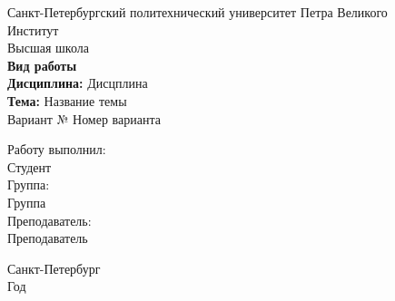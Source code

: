 \documentclass[12pt,a4paper]{scrartcl}
\begin{document}
\begin{titlepage}
\begin{center}

\large
Санкт-Петербургский политехнический университет Петра Великого %
\\
Институт %
\\
Высшая школа %
\\[5.5cm]


\large \textbf{
Вид работы %
}\\
\large \textbf{Дисциплина:}
Дисцплина %
\\
\large \textbf{Тема:} %
Название темы %
\\
\large Вариант № %
Номер варианта %
\\ [3.7cm]


\end{center}

\vfill

\hfill\begin{minipage}{0.25\textwidth}
  Работу выполнил:\\
Студент %
  \\
  Группа:\\
Группа %
    \\
    Преподаватель:\\
Преподаватель %
    \\
\end{minipage}%

\vfill

\begin{center}
\large Санкт-Петербург %
\\
Год %
\end{center} 

\end{titlepage}
\end{document}
